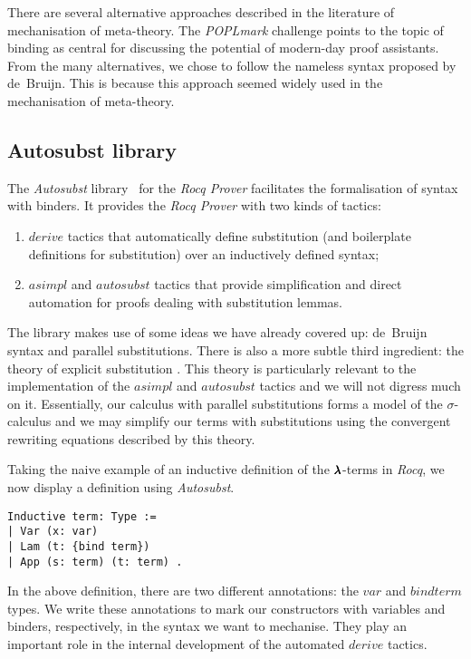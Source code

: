 There are several alternative approaches described in the literature of mechanisation of meta-theory. 
The \textit{POPLmark} challenge \cite{POPLmark} points to the topic of binding as central for discussing the potential of modern-day proof assistants.
From the many alternatives, we chose to follow the nameless syntax proposed by de~Bruijn.
This is because this approach seemed widely used in the mechanisation of meta-theory.

\subsection{Autosubst library}

The \textit{Autosubst} library~\cite{AutosubstSchafer,AutosubstManual} for the \textit{Rocq Prover} facilitates the formalisation of syntax with binders.
It provides the \textit{Rocq Prover} with two kinds of tactics:
\begin{enumerate}
  \item \lst$derive$ tactics that automatically define substitution (and boilerplate definitions for substitution) over an inductively defined syntax;
  \item \lst$asimpl$ and \lst$autosubst$ tactics that provide simplification and direct automation for proofs dealing with substitution lemmas.
\end{enumerate}

The library makes use of some ideas we have already covered up: de~Bruijn syntax and parallel substitutions.
There is also a more subtle third ingredient: the theory of explicit substitution \cite{Abadi}.
This theory is particularly relevant to the implementation of the \lst$asimpl$ and \lst$autosubst$ tactics and we will not digress much on it.
Essentially, our calculus with parallel substitutions forms a model of the $\sigma$-calculus and we may simplify our terms with substitutions using the convergent rewriting equations described by this theory.

Taking the naive example of an inductive definition of the $\pmb{\lambda}$-terms in \textit{Rocq}, we now display a definition using \textit{Autosubst}.

\begin{lstlisting}[language=Coq]
Inductive term: Type :=
| Var (x: var)
| Lam (t: {bind term})
| App (s: term) (t: term) .
\end{lstlisting}

In the above definition, there are two different annotations: the \lst$var$ and \lst${bind term}$ types.
We write these annotations to mark our constructors with variables and binders, respectively, in the syntax we want to mechanise.
They play an important role in the internal development of the automated \lst$derive$ tactics.

